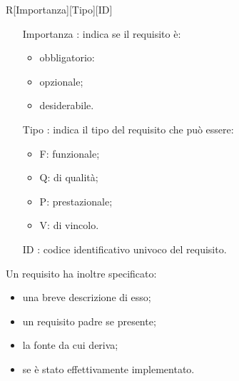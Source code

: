 		\centerline{R[Importanza][Tipo][ID]}
		\begin{itemize}
		
			\item[Importanza]: indica se il requisito è:
			
			\begin{itemize}
				\item obbligatorio:
				\item opzionale;
				\item desiderabile.
			\end{itemize}
			
			\item[Tipo]: indica il tipo del requisito che può essere:
			
			\begin{itemize}
				\item F: funzionale;
				\item Q: di qualità;
				\item P: prestazionale;
				\item V: di vincolo.
			\end{itemize}
			
			\item [ID]: codice identificativo univoco del requisito.
			
		\end{itemize}
		
		Un requisito ha inoltre specificato:
		\begin{itemize}
		\item una breve descrizione di esso;
		\item un requisito padre se presente;
		\item la fonte da cui deriva;
		\item se è stato effettivamente implementato.
		\end{itemize}
